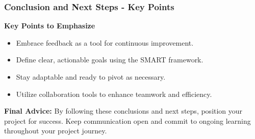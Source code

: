 \documentclass[aspectratio=169]{beamer}
\begin{document}
\begin{frame}[fragile]
  \frametitle{Conclusion and Next Steps - Key Points}
  \textbf{Key Points to Emphasize}
  \begin{itemize}
    \item Embrace feedback as a tool for continuous improvement.
    \item Define clear, actionable goals using the SMART framework.
    \item Stay adaptable and ready to pivot as necessary.
    \item Utilize collaboration tools to enhance teamwork and efficiency.
  \end{itemize}
  
  \textbf{Final Advice:}
  By following these conclusions and next steps, position your project for success. Keep communication open and commit to ongoing learning throughout your project journey.
\end{frame}
\end{document}
